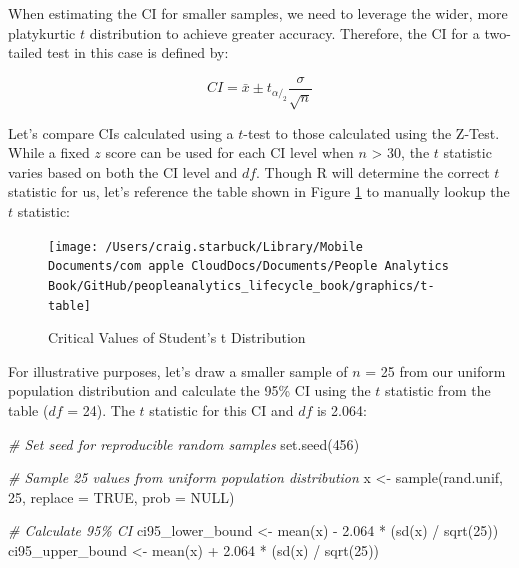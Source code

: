 \documentclass[
]{book}
\newenvironment{Shaded}{\begin{snugshade}}{\end{snugshade}}
\newcommand{\AttributeTok}[1]{\textcolor[rgb]{0.77,0.63,0.00}{#1}}
\newcommand{\CommentTok}[1]{\textcolor[rgb]{0.56,0.35,0.01}{\textit{#1}}}
\newcommand{\ConstantTok}[1]{\textcolor[rgb]{0.00,0.00,0.00}{#1}}
\newcommand{\DecValTok}[1]{\textcolor[rgb]{0.00,0.00,0.81}{#1}}
\newcommand{\FloatTok}[1]{\textcolor[rgb]{0.00,0.00,0.81}{#1}}
\newcommand{\FunctionTok}[1]{\textcolor[rgb]{0.00,0.00,0.00}{#1}}
\newcommand{\NormalTok}[1]{#1}
\newcommand{\OtherTok}[1]{\textcolor[rgb]{0.56,0.35,0.01}{#1}}
\newcommand{\SpecialCharTok}[1]{\textcolor[rgb]{0.00,0.00,0.00}{#1}}
\begin{document}
When estimating the CI for smaller samples, we need to leverage the wider, more platykurtic \(t\) distribution to achieve greater accuracy. Therefore, the CI for a two-tailed test in this case is defined by:

\[ CI = \bar{x} \pm t_{\alpha/_2} \frac{\sigma}{\sqrt{n}} \]

Let's compare CIs calculated using a \(t\)-test to those calculated using the Z-Test. While a fixed \(z\) score can be used for each CI level when \(n\) \textgreater{} 30, the \(t\) statistic varies based on both the CI level and \(df\). Though R will determine the correct \(t\) statistic for us, let's reference the table shown in Figure \ref{fig:t-crit} to manually lookup the \(t\) statistic:

\begin{figure}

{\centering \texttt{[image: /Users/craig.starbuck/Library/Mobile Documents/com~apple~CloudDocs/Documents/People Analytics Book/GitHub/peopleanalytics\_lifecycle\_book/graphics/t-table]} 

}

\caption{Critical Values of Student's t Distribution}\label{fig:t-crit}
\end{figure}

For illustrative purposes, let's draw a smaller sample of \(n\) = 25 from our uniform population distribution and calculate the 95\% CI using the \(t\) statistic from the table (\(df\) = 24). The \(t\) statistic for this CI and \(df\) is 2.064:

\begin{Shaded}
\begin{Highlighting}[]
\CommentTok{\# Set seed for reproducible random samples}
\FunctionTok{set.seed}\NormalTok{(}\DecValTok{456}\NormalTok{)}

\CommentTok{\# Sample 25 values from uniform population distribution}
\NormalTok{x }\OtherTok{\textless{}{-}} \FunctionTok{sample}\NormalTok{(rand.unif, }\DecValTok{25}\NormalTok{, }\AttributeTok{replace =} \ConstantTok{TRUE}\NormalTok{, }\AttributeTok{prob =} \ConstantTok{NULL}\NormalTok{)}

\CommentTok{\# Calculate 95\% CI}
\NormalTok{ci95\_lower\_bound }\OtherTok{\textless{}{-}} \FunctionTok{mean}\NormalTok{(x) }\SpecialCharTok{{-}} \FloatTok{2.064} \SpecialCharTok{*}\NormalTok{ (}\FunctionTok{sd}\NormalTok{(x) }\SpecialCharTok{/} \FunctionTok{sqrt}\NormalTok{(}\DecValTok{25}\NormalTok{))}
\NormalTok{ci95\_upper\_bound }\OtherTok{\textless{}{-}} \FunctionTok{mean}\NormalTok{(x) }\SpecialCharTok{+} \FloatTok{2.064} \SpecialCharTok{*}\NormalTok{ (}\FunctionTok{sd}\NormalTok{(x) }\SpecialCharTok{/} \FunctionTok{sqrt}\NormalTok{(}\DecValTok{25}\NormalTok{))}
\end{Highlighting}
\end{Shaded}
\end{document}
